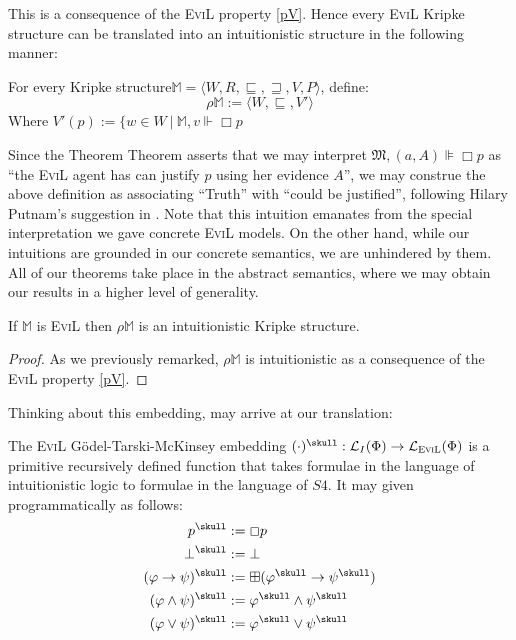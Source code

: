 This is a consequence of the \textsc{EviL} property \ref{pV}.  Hence every \textsc{EviL} Kripke structure can be translated into an
intuitionistic structure in the following manner:

\begin{definition}
For every Kripke structure$\mathbb{M} = \langle W, R, \sqsubseteq,
\sqsupseteq, V, P \rangle$, define:
\[ \rho\mathbb{M} := \langle W, \sqsubseteq, V'\rangle\]
Where $V'(p) := \{ w \in W\ |\ \mathbb{M},v \Vdash \Box p$
\end{definition}

Since the Theorem Theorem asserts that we may interpret
$\mathfrak{M},(a,A) \VDash \Box p$ as ``the \textsc{EviL} agent has
can justify $p$ using her evidence $A$'', we may construe the above
definition as associating ``Truth'' with ``could be justified'',
following Hilary Putnam's suggestion in
\cite{putnam_problem_1981}. Note that this intuition emanates from the
special interpretation we gave concrete \textsc{EviL} models.  
On the other hand, while our intuitions are grounded in our concrete
semantics, we are unhindered by them.  All of our theorems take
place in the abstract semantics, where we may obtain our results in
a higher level of generality.

\begin{lemma}
If $\mathbb{M}$ is \textsc{EviL} then $\rho \mathbb{M}$ is an intuitionistic Kripke structure.
\end{lemma}
\begin{proof}
As we previously remarked, $\rho\mathbb{M}$ is intuitionistic as a
consequence of the \textsc{EviL} property \ref{pV}.
\end{proof}

Thinking about this embedding, may arrive at our translation:

\begin{mydef}
The \textsc{EviL} G\"{o}del-Tarski-McKinsey embedding $(\cdot)^\skull:
\mathcal{L}_I(\Phi) \to \mathcal{L}_{\textup{\textsc{EviL}}}(\Phi)$ is a primitive recursively
defined function that takes formulae in the language of intuitionistic
logic to formulae in the language of $S4$.  It may given
programmatically as follows: 
\begin{align*}
  p^\skull & := \Box p \\
  \bot^\skull & := \bot \\
  (\phi \to \psi)^\skull & := \BP(\phi^\skull \to \psi^\skull) \\
  (\phi \wedge \psi)^\skull & := \phi^\skull \wedge \psi^\skull \\
  (\phi \vee \psi)^\skull & := \phi^\skull \vee \psi^\skull \\
\end{align*}
\end{mydef}

